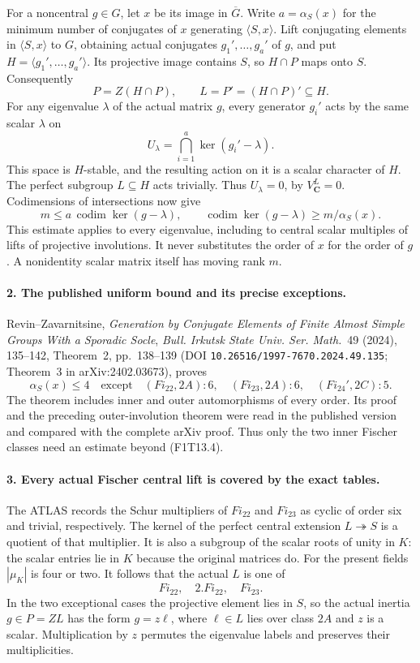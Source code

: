 For a noncentral \(g\in G\), let \(x\) be its image in
\(\overline G\). Write \(a=\alpha_S(x)\) for the minimum
number of conjugates of \(x\) generating \(\langle S,x\rangle\).
Lift conjugating elements in \(\langle S,x\rangle\) to
\(G\), obtaining actual conjugates \(g_1',\ldots,g_a'\) of
\(g\), and put \(H=\langle g_1',\ldots,g_a'\rangle\).
Its projective image contains \(S\), so \(H\cap P\) maps
onto \(S\). Consequently
\[
 P=Z(H\cap P),\qquad
 L=P'=(H\cap P)'\subseteq H.
 \tag{F1T13.3}
\]
For any eigenvalue \(\lambda\) of the actual matrix \(g\),
every generator \(g_i'\) acts by the same scalar \(\lambda\)
on
\[
 U_\lambda=\bigcap_{i=1}^{a}\ker(g_i'-\lambda).
\]
This space is \(H\)-stable, and the resulting action on it
is a scalar character of \(H\). The perfect subgroup
\(L\subseteq H\) acts trivially. Thus \(U_\lambda=0\),
by \(V_{\mathbf C}^L=0\). Codimensions of intersections now give
\[
 m\le a\,\operatorname{codim}\ker(g-\lambda),\qquad
 \operatorname{codim}\ker(g-\lambda)\ge m/\alpha_S(x).
 \tag{F1T13.4}
\]
This estimate applies to every eigenvalue, including to central
scalar multiples of lifts of projective involutions. It never
substitutes the order of \(x\) for the order of \(g\).
A nonidentity scalar matrix itself has moving rank \(m\).

\paragraph{2. The published uniform bound and its precise exceptions.}
Revin--Zavarnitsine, \emph{Generation by Conjugate Elements of
Finite Almost Simple Groups With a Sporadic Socle},
\emph{Bull. Irkutsk State Univ. Ser. Math.}~49 (2024),
135--142, Theorem~2, pp.~138--139
(DOI \texttt{10.26516/1997-7670.2024.49.135};
Theorem~3 in arXiv:2402.03673), proves
\[
 \alpha_S(x)\le4
 \quad\text{except}\quad
 (Fi_{22},2A):6,\quad (Fi_{23},2A):6,\quad
 (Fi_{24}',2C):5.
 \tag{F1T13.5}
\]
The theorem includes inner and outer automorphisms of every
order. Its proof and the preceding outer-involution theorem
were read in the published version and compared with the
complete arXiv proof. Thus only the two inner Fischer classes
need an estimate beyond (F1T13.4).

\paragraph{3. Every actual Fischer central lift is covered by the exact tables.}
The ATLAS records the Schur multipliers of \(Fi_{22}\) and
\(Fi_{23}\) as cyclic of order six and trivial, respectively.
The kernel of the perfect central extension
\(L\twoheadrightarrow S\) is a quotient of that multiplier.
It is also a subgroup of the scalar roots of unity in \(K\):
the scalar entries lie in \(K\) because the original matrices
do. For the present fields \(|\mu_K|\) is four or two.
It follows that the actual \(L\) is one of
\[
 Fi_{22},\quad 2.Fi_{22},\quad Fi_{23}.
 \tag{F1T13.6}
\]
In the two exceptional cases the projective element lies in
\(S\), so the actual inertia \(g\in P=ZL\) has the form
\(g=z\ell\), where \(\ell\in L\) lies over class \(2A\)
and \(z\) is a scalar. Multiplication by \(z\) permutes the
eigenvalue labels and preserves their multiplicities.

